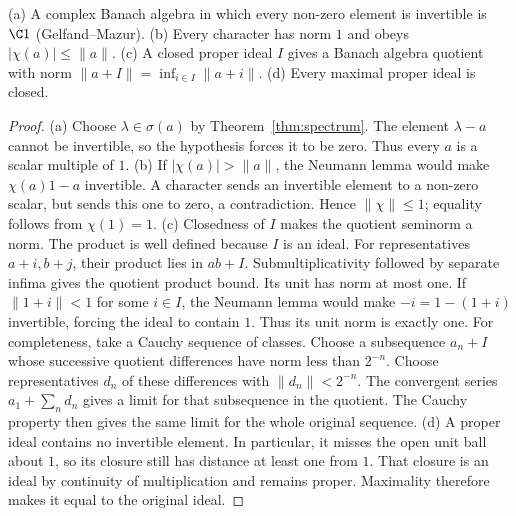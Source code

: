 \begin{lemma}\label{lem:gelfandmazur}
(a) A complex Banach algebra in which every non-zero element is invertible is $\C1$ (Gelfand--Mazur).
(b) Every character has norm $1$ and obeys $|\chi(a)|\le\|a\|$.
(c) A closed proper ideal $I$ gives a Banach algebra quotient with norm $\|a+I\|=\inf_{i\in I}\|a+i\|$.
(d) Every maximal proper ideal is closed.
\end{lemma}
\begin{proof}
(a) Choose $\lambda\in\sigma(a)$ by Theorem~\ref{thm:spectrum}. The element $\lambda-a$ cannot be invertible, so the hypothesis forces it to be zero. Thus every $a$ is a scalar multiple of $1$.
(b) If $|\chi(a)|>\|a\|$, the Neumann lemma would make $\chi(a)1-a$ invertible. A character sends an invertible element to a non-zero scalar, but sends this one to zero, a contradiction. Hence $\|\chi\|\le1$; equality follows from $\chi(1)=1$.
(c) Closedness of $I$ makes the quotient seminorm a norm. The product is well defined because $I$ is an ideal. For representatives $a+i,b+j$, their product lies in $ab+I$. Submultiplicativity followed by separate infima gives the quotient product bound. Its unit has norm at most one. If $\|1+i\|<1$ for some $i\in I$, the Neumann lemma would make $-i=1-(1+i)$ invertible, forcing the ideal to contain $1$. Thus its unit norm is exactly one.
For completeness, take a Cauchy sequence of classes. Choose a subsequence $a_n+I$ whose successive quotient differences have norm less than $2^{-n}$. Choose representatives $d_n$ of these differences with $\|d_n\|<2^{-n}$. The convergent series $a_1+\sum_nd_n$ gives a limit for that subsequence in the quotient. The Cauchy property then gives the same limit for the whole original sequence.
(d) A proper ideal contains no invertible element. In particular, it misses the open unit ball about $1$, so its closure still has distance at least one from $1$. That closure is an ideal by continuity of multiplication and remains proper. Maximality therefore makes it equal to the original ideal.
\end{proof}

